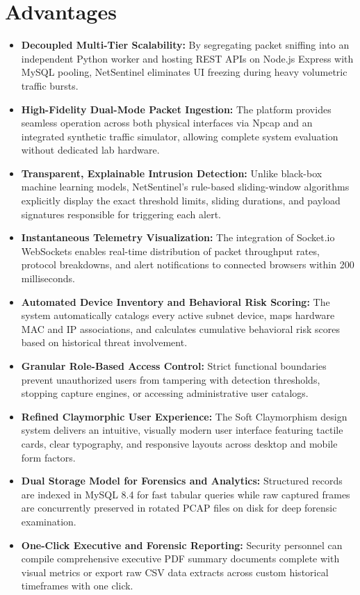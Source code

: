 \documentclass[a4paper,12pt]{report}
\begin{document}
	\section{Advantages}
	\begin{itemize}
		\item \textbf{Decoupled Multi-Tier Scalability:}
		By segregating packet sniffing into an independent Python worker and hosting REST APIs on Node.js Express with MySQL pooling, NetSentinel eliminates UI freezing during heavy volumetric traffic bursts.
		
		\item \textbf{High-Fidelity Dual-Mode Packet Ingestion:}
		The platform provides seamless operation across both physical interfaces via Npcap and an integrated synthetic traffic simulator, allowing complete system evaluation without dedicated lab hardware.
		
		\item \textbf{Transparent, Explainable Intrusion Detection:}
		Unlike black-box machine learning models, NetSentinel's rule-based sliding-window algorithms explicitly display the exact threshold limits, sliding durations, and payload signatures responsible for triggering each alert.
		
		\item \textbf{Instantaneous Telemetry Visualization:}
		The integration of Socket.io WebSockets enables real-time distribution of packet throughput rates, protocol breakdowns, and alert notifications to connected browsers within 200 milliseconds.
		
		\item \textbf{Automated Device Inventory and Behavioral Risk Scoring:}
		The system automatically catalogs every active subnet device, maps hardware MAC and IP associations, and calculates cumulative behavioral risk scores based on historical threat involvement.
		
		\item \textbf{Granular Role-Based Access Control:}
		Strict functional boundaries prevent unauthorized users from tampering with detection thresholds, stopping capture engines, or accessing administrative user catalogs.
		
		\item \textbf{Refined Claymorphic User Experience:}
		The Soft Claymorphism design system delivers an intuitive, visually modern user interface featuring tactile cards, clear typography, and responsive layouts across desktop and mobile form factors.
		
		\item \textbf{Dual Storage Model for Forensics and Analytics:}
		Structured records are indexed in MySQL 8.4 for fast tabular queries while raw captured frames are concurrently preserved in rotated PCAP files on disk for deep forensic examination.
		
		\item \textbf{One-Click Executive and Forensic Reporting:}
		Security personnel can compile comprehensive executive PDF summary documents complete with visual metrics or export raw CSV data extracts across custom historical timeframes with one click.
	\end{itemize}
	
\end{document}
